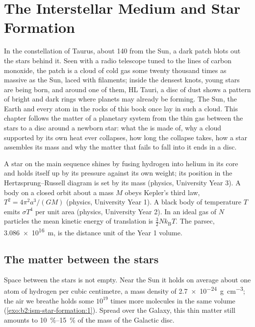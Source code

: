 \chapter{The Interstellar Medium and Star Formation}\label{ch:b2:ism-star-formation}

In the constellation of Taurus, about \qty{140}{\parsec} from the Sun, a dark
patch blots out the stars behind it. Seen with a radio telescope tuned to the
lines of carbon monoxide, the patch is a cloud of cold gas some twenty
thousand times as massive as the Sun, laced with filaments; inside the densest
knots, young stars are being born, and around one of them, HL Tauri, a disc of
dust shows a pattern of bright and dark rings where planets may already be
forming. The Sun, the Earth and every atom in the rocks of this book once lay
in such a cloud. This chapter follows the matter of a planetary system from
the thin gas between the stars to a disc around a newborn star: what the
 is made of, why a cloud supported by its own heat ever
collapses, how long the collapse takes, how a star assembles its mass and
why the matter that fails to fall into it ends in a disc.

\begin{recall}
A star on the main sequence shines by fusing hydrogen into helium in its
core and holds itself up by its pressure against its own weight; its
position in the Hertzsprung--Russell diagram is set by its mass (physics,
University Year 3). A body on a closed orbit about a mass $M$ obeys Kepler's
third law, $T^2 = 4\pi^2 a^3/(GM)$ (physics, University Year 1). A black body
of temperature $T$ emits $\sigma T^4$ per unit area (physics, University
Year 2). In an ideal gas of $N$ particles the mean kinetic energy of
translation is $\tfrac32 N k_{\mathrm B} T$. The parsec,
\qty{3.086e16}{m}, is the distance unit of the Year 1 volume.
\end{recall}

\section{The matter between the stars}

Space between the stars is not empty. Near the Sun it holds on average about
one atom of hydrogen per cubic centimetre, a mass density of
\qty{2.7e-24}{g.cm^{-3}}; the air we breathe holds some $10^{19}$ times more
molecules in the same volume (\cref{exo:b2:ism-star-formation:1}). Spread over the Galaxy, this thin
matter still amounts to \qtyrange{10}{15}{\percent} of the mass of the
Galactic disc.

